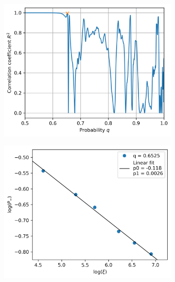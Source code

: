 \documentclass[a4paper]{article}
\begin{document}
\begin{figure}[h]
    \centering
    \begin{subfigure}[b]{0.49\textwidth}
        \includegraphics[width=\textwidth]{honeycomb_rsquared.png}
        \caption{}
    \end{subfigure}
    \begin{subfigure}[b]{0.49\textwidth}
        \includegraphics[width=\textwidth]{honeycomb_giant_vs_xi.png}
        \caption{}
    \end{subfigure}

\end{figure}
\end{document}
